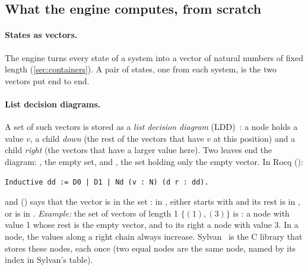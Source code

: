 \subsection{What the engine computes, from scratch}\label{sec:prooflog:background}

\paragraph{States as vectors.} The engine turns every state of a system
into a vector of natural numbers of fixed length (\cref{sec:containers}).
A pair of states, one from each system, is the two vectors put end to
end.

\paragraph{List decision diagrams.} A set of such vectors is stored as a
\emph{list decision diagram} (LDD)~\cite{blom-vdpol08}: a node holds a
value $v$, a child \emph{down} (the rest of the vectors that have $v$ at
this position) and a child \emph{right} (the vectors that have a larger
value here). Two leaves end the diagram: , the empty set, and
, the set holding only the empty vector. In Rocq
():
\begin{verbatim}
Inductive dd := D0 | D1 | Nd (v : N) (d r : dd).
\end{verbatim}
and  () says that the vector
 is in the set : in , either  starts
with  and its rest is in , or  is in .
\emph{Example:} the set of vectors of length 1 $\{(1), (3)\}$ is
: a node with value 1 whose rest is the empty
vector, and to its right a node with value 3. In a node, the values along
a right chain always increase. Sylvan~\cite{vandijk-vdpol15} is the C
library that stores these nodes, each once (two equal nodes are the same
node, named by its index in Sylvan's table).


